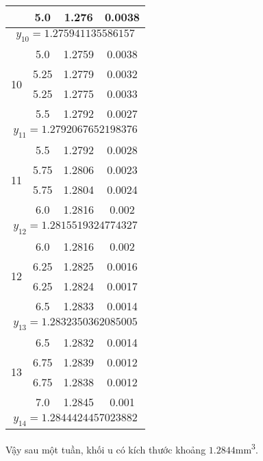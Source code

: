 \begin{longtable}{|c|c|c|c|}
	                    & 5.0   & 1.276  & 0.0038       \\ \hline
	\multicolumn{4}{|c|}{$y_{10} = 1.275941135586157$}    \\ \hline
	\multirow{4}{*}{10} & 5.0   & 1.2759 & 0.0038       \\ \cline{2-4} 
	                    & 5.25  & 1.2779 & 0.0032       \\ \cline{2-4} 
	                    & 5.25  & 1.2775 & 0.0033       \\ \cline{2-4} 
	                    & 5.5   & 1.2792 & 0.0027       \\ \hline
	\multicolumn{4}{|c|}{$y_{11} = 1.2792067652198376$}   \\ \hline
	\multirow{4}{*}{11} & 5.5   & 1.2792 & 0.0028       \\ \cline{2-4} 
	                    & 5.75  & 1.2806 & 0.0023       \\ \cline{2-4} 
	                    & 5.75  & 1.2804 & 0.0024       \\ \cline{2-4} 
	                    & 6.0   & 1.2816 & 0.002        \\ \hline
	\multicolumn{4}{|c|}{$y_{12} = 1.2815519324774327$}   \\ \hline
	\multirow{4}{*}{12} & 6.0   & 1.2816 & 0.002        \\ \cline{2-4} 
	                    & 6.25  & 1.2825 & 0.0016       \\ \cline{2-4} 
	                    & 6.25  & 1.2824 & 0.0017       \\ \cline{2-4} 
	                    & 6.5   & 1.2833 & 0.0014       \\ \hline
	\multicolumn{4}{|c|}{$y_{13} = 1.2832350362085005$}   \\ \hline
	\multirow{4}{*}{13} & 6.5   & 1.2832 & 0.0014       \\ \cline{2-4} 
	                    & 6.75  & 1.2839 & 0.0012       \\ \cline{2-4} 
	                    & 6.75  & 1.2838 & 0.0012       \\ \cline{2-4} 
	                    & 7.0   & 1.2845 & 0.001        \\ \hline
	\multicolumn{4}{|c|}{$y_{14} = 1.2844424457023882$}   \\ \hline
\end{longtable}
Vậy sau một tuần, khối u có kích thước khoảng $1.2844$mm\textsuperscript{3}.
